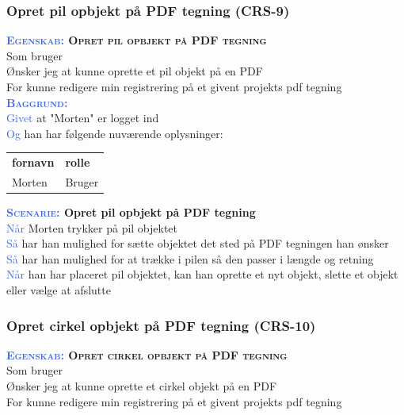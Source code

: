 \subsubsection{Opret pil opbjekt på PDF tegning (CRS-9)} \label{sec:USOpretPilObjekt}
\textbf{\textsc{\textcolor{RoyalBlue}{Egenskab:} Opret pil opbjekt på PDF tegning}}\\
Som bruger\\
Ønsker jeg at kunne oprette et pil objekt på en PDF\\
For kunne redigere min registrering på et givent projekts pdf tegning\\

\textsc{\textcolor{RoyalBlue}{\textbf{Baggrund:}}}\\
\textcolor{RoyalBlue}{Givet} at "Morten" er logget ind\\
\textcolor{RoyalBlue}{Og} han har følgende nuværende oplysninger:\\
\begin{tabular}{| l | l |}
	\textbf{fornavn} & \textbf{rolle} \\
	Morten & Bruger\\
\end{tabular}

\textbf{\textsc{\textcolor{RoyalBlue}{Scenarie:}} Opret pil opbjekt på PDF tegning}\\
\textcolor{RoyalBlue}{Når} Morten trykker på pil objektet\\
\textcolor{RoyalBlue}{Så}  har han mulighed for sætte objektet det sted på PDF tegningen han ønsker\\
\textcolor{RoyalBlue}{Så}  har han mulighed for at trække i pilen så den passer i længde og retning\\
\textcolor{RoyalBlue}{Når} han har placeret pil objektet, kan han oprette et nyt objekt, slette et objekt eller vælge at afslutte \\

\subsubsection{Opret cirkel opbjekt på PDF tegning (CRS-10)} \label{sec:USOpretCirkelObjekt}
\textbf{\textsc{\textcolor{RoyalBlue}{Egenskab:} Opret cirkel opbjekt på PDF tegning}}\\
Som bruger\\
Ønsker jeg at kunne oprette et cirkel objekt på en PDF\\
For kunne redigere min registrering på et givent projekts pdf tegning\\

